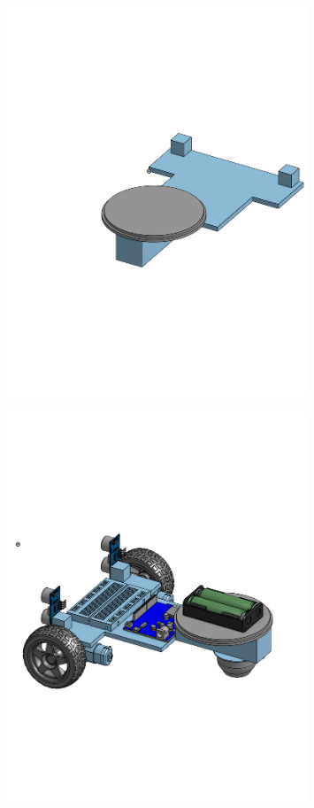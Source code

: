 \documentclass[a4paper,12pt]{article}
\begin{document}
\begin{center}\begin{figure}[H]\centering\includegraphics[width=0.8\textwidth]{./model_images/a1.png}\end{figure}\FloatBarrier\end{center}
\begin{center}\begin{figure}[H]\centering\includegraphics[width=0.8\textwidth]{./model_images/a2.png}\end{figure}\FloatBarrier\end{center}
\end{document}
